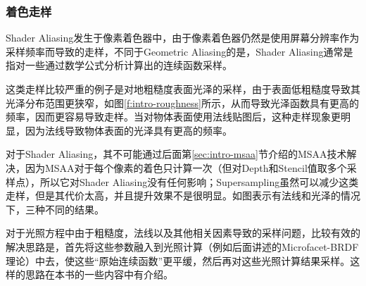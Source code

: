 \subsubsection{着色走样}
Shader Aliasing发生于像素着色器中，由于像素着色器仍然是使用屏幕分辨率作为采样频率而导致的走样，不同于Geometric Aliasing的是，Shader Aliasing通常是指对一些通过数学公式分析计算出的连续函数采样。

这类走样比较严重的例子是对地粗糙度表面光泽的采样，由于表面低粗糙度导致其光泽分布范围更狭窄，如图\ref{f:intro-roughness}所示，从而导致光泽函数具有更高的频率，因而更容易导致走样。当对物体表面使用法线贴图后，这种走样现象更明显，因为法线导致物体表面的光泽具有更高的频率。

对于Shader Aliasing，其不可能通过后面第\ref{sec:intro-msaa}节介绍的MSAA技术解决，因为MSAA对于每个像素的着色只计算一次（但对Depth和Stencil值取多个采样点），所以它对Shader Aliasing没有任何影响；Supersampling虽然可以减少这类走样，但是其代价太高，并且提升效果不是很明显。如图表示有法线和光泽的情况下，三种不同的结果。

对于光照方程中由于粗糙度，法线以及其他相关因素导致的采样问题，比较有效的解决思路是，首先将这些参数融入到光照计算（例如后面讲述的Microfacet-BRDF理论）中去，使这些“原始连续函数”更平缓，然后再对这些光照计算结果采样。这样的思路在本书的一些内容中有介绍。

